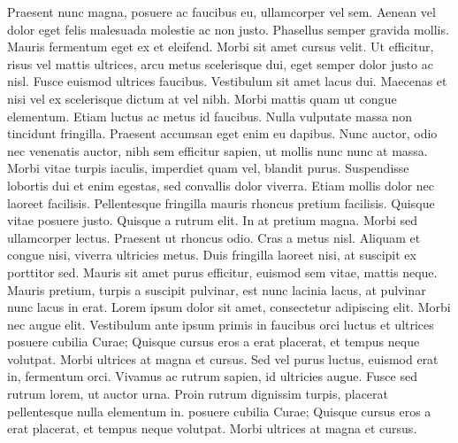 \documentclass[twoside]{article}
\begin{document}
 Praesent nunc magna, posuere ac faucibus eu, ullamcorper vel sem.
 Aenean vel dolor eget felis malesuada molestie ac non justo.
 Phasellus semper gravida mollis.
 Mauris fermentum eget ex et eleifend.
 Morbi sit amet cursus velit.
 Ut efficitur, risus vel mattis ultrices, arcu metus scelerisque dui, eget semper dolor justo ac nisl.
 Fusce euismod ultrices faucibus.
 Vestibulum sit amet lacus dui.
 Maecenas et nisi vel ex scelerisque dictum at vel nibh.
 Morbi mattis quam ut congue elementum.
 Etiam luctus ac metus id faucibus.
 Nulla vulputate massa non tincidunt fringilla.
 Praesent accumsan eget enim eu dapibus.
 Nunc auctor, odio nec venenatis auctor, nibh sem efficitur sapien, ut mollis nunc nunc at massa.
 Morbi vitae turpis iaculis, imperdiet quam vel, blandit purus.
 Suspendisse lobortis dui et enim egestas, sed convallis dolor viverra.
 Etiam mollis dolor nec laoreet facilisis.
 Pellentesque fringilla mauris rhoncus pretium facilisis.
 Quisque vitae posuere justo.
 Quisque a rutrum elit.
 In at pretium magna.
 Morbi sed ullamcorper lectus.
 Praesent ut rhoncus odio.
 Cras a metus nisl.
 Aliquam et congue nisi, viverra ultricies metus.
 Duis fringilla laoreet nisi, at suscipit ex porttitor sed.
 Mauris sit amet purus efficitur, euismod sem vitae, mattis neque.
 Mauris pretium, turpis a suscipit pulvinar, est nunc lacinia lacus, at pulvinar nunc lacus in erat.
 Lorem ipsum dolor sit amet, consectetur adipiscing elit.
 Morbi nec augue elit.
 Vestibulum ante ipsum primis in faucibus orci luctus et ultrices posuere cubilia Curae; Quisque cursus eros a erat placerat, et tempus neque volutpat.
 Morbi ultrices at magna et cursus.
 Sed vel purus luctus, euismod erat in, fermentum orci.
 Vivamus ac rutrum sapien, id ultricies augue.
 Fusce sed rutrum lorem, ut auctor urna.
 Proin rutrum dignissim turpis, placerat pellentesque nulla elementum in.
 posuere cubilia Curae; Quisque cursus eros a erat placerat, et tempus neque volutpat.
 Morbi ultrices at magna et cursus.
\end{document}
